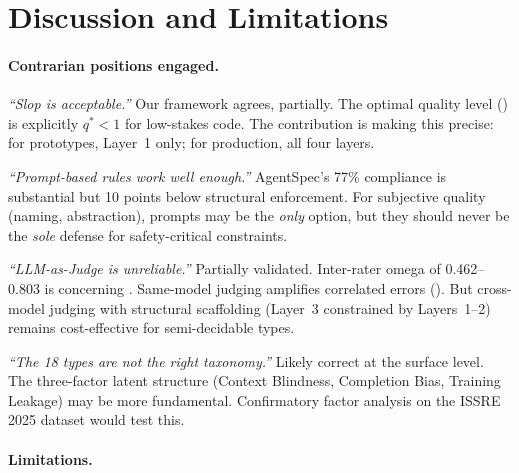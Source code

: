 \documentclass[11pt, a4paper, copyright]{googledeepmind}
\begin{document}
\section{Discussion and Limitations}
\label{sec:discussion}

\paragraph{Contrarian positions engaged.}

\emph{``Slop is acceptable.''} Our framework agrees, partially. The optimal quality level () is explicitly $q^* < 1$ for low-stakes code. The contribution is making this precise: for prototypes, Layer~1 only; for production, all four layers.

\emph{``Prompt-based rules work well enough.''} AgentSpec's 77\% compliance is substantial but 10 points below structural enforcement. For subjective quality (naming, abstraction), prompts may be the \emph{only} option, but they should never be the \emph{sole} defense for safety-critical constraints.

\emph{``LLM-as-Judge is unreliable.''} Partially validated. Inter-rater omega of 0.462--0.803 is concerning \citep{llmjudgetrust2024}. Same-model judging amplifies correlated errors (). But cross-model judging with structural scaffolding (Layer~3 constrained by Layers~1--2) remains cost-effective for semi-decidable types.

\emph{``The 18 types are not the right taxonomy.''} Likely correct at the surface level. The three-factor latent structure (Context Blindness, Completion Bias, Training Leakage) may be more fundamental. Confirmatory factor analysis on the ISSRE 2025 dataset would test this.

\paragraph{Limitations.}
\end{document}
